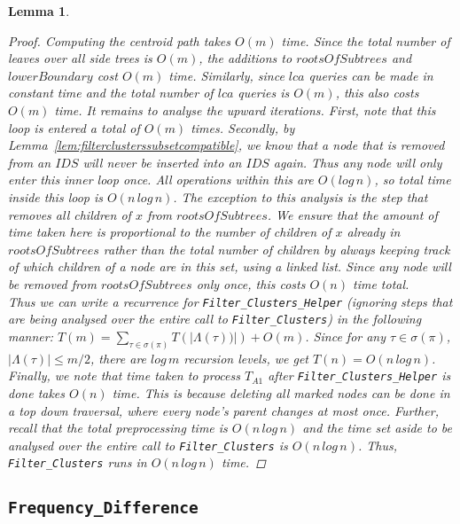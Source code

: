 \documentclass{article}
\newcommand{\leafset}{\Lambda}
\newtheorem{filterclustersruntime}[incompatibility]{Lemma}
\begin{document}
\begin{filterclustersruntime}
\begin{proof}
            Computing the centroid path takes $O(m)$ time. Since the total number of leaves over all side trees is $O(m)$, the additions to $rootsOfSubtrees$ and $lowerBoundary$ cost $O(m)$ time. Similarly, since $lca$ queries can be made in constant time and the total number of $lca$ queries is $O(m)$, this also costs $O(m)$ time. It remains to analyse the upward iterations. First, note that this loop is entered a total of $O(m)$ times. Secondly, by Lemma~\ref{lem:filterclusterssubsetcompatible}, we know that a node that is removed from an $IDS$ will never be inserted into an $IDS$ again. Thus any node will only enter this inner loop once. All operations within this are $O(log\,n)$, so total time inside this loop is $O(n\,log\,n)$. The exception to this analysis is the step that removes all children of $x$ from $rootsOfSubtrees$. We ensure that the amount of time taken here is proportional to the number of children of $x$ already in $rootsOfSubtrees$ rather than the total number of children by always keeping track of which children of a node are in this set, using a linked list. Since any node will be removed from $rootsOfSubtrees$ only once, this costs $O(n)$ time total.\\

            Thus we can write a recurrence for \texttt{Filter\_Clusters\_Helper} (ignoring steps that are being analysed over the entire call to \texttt{Filter\_Clusters}) in the following manner: $T(m) = \sum_{\tau \in \sigma(\pi)}T(|\leafset(\tau))|) + O(m)$. Since for any $\tau \in \sigma(\pi)$, $|\leafset(\tau)| \leq m/2$, there are $log\,m$ recursion levels, we get $T(n) = O(n\,log\,n)$.\\

            Finally, we note that time taken to process $T_{A1}$ after \texttt{Filter\_Clusters\_Helper} is done takes $O(n)$ time. This is because deleting all marked nodes can be done in a top down traversal, where every node's parent changes at most once. Further, recall that the total preprocessing time is $O(n\,log\,n)$ and the time set aside to be analysed over the entire call to \texttt{Filter\_Clusters} is $O(n\,log\,n)$. Thus, \texttt{Filter\_Clusters} runs in $O(n\,log\,n)$ time.
        \end{proof}
    \end{filterclustersruntime}

    \subsection{\texttt{Frequency\_Difference}}
\end{document}
